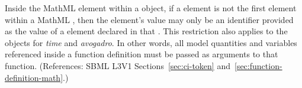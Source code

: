 Inside the  MathML element within a \FunctionDefinition
object, if a  element is not the first element within a MathML
, then the  element's value may only be an
identifier provided as the value of a  element declared in that
.  This restriction also applies to the 
objects for \emph{time} and \emph{avogadro}.  In other words, all model
quantities and variables referenced inside a function definition must be
passed as arguments to that function.  (References: SBML L3V1
Sections~\ref{sec:ci-token} and~\ref{sec:function-definition-math}.)
